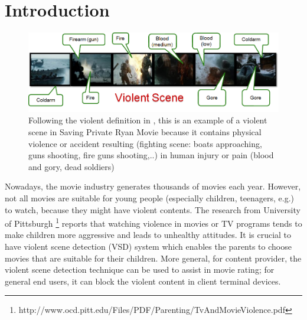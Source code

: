 \documentclass[review]{elsarticle}
\begin{document}
\linenumbers

\section{Introduction}

\begin{figure}[!b]
	\centering
	\includegraphics[width=1\linewidth]{Images/ViolentScene.png}
	\caption{Following the violent definition in \cite{demarty2014benchmarking}, this is an example of a violent scene in Saving Private Ryan Movie because it contains physical violence or accident resulting (fighting scene: boats approaching, guns shooting, fire guns shooting,..) in human injury or pain (blood and gory, dead soldiers)}
	\label{fig:exampleVS}
\end{figure}

Nowadays, the movie industry generates thousands of movies each year. However, not all movies are suitable for young people (especially children, teenagers, e.g.) to watch, because they might have violent contents.   The research from University of Pittsburgh \footnote{http://www.ocd.pitt.edu/Files/PDF/Parenting/TvAndMovieViolence.pdf} reports that watching violence in movies or TV programs tends to make children more aggressive and leads to unhealthy attitudes. It is crucial to have violent scene detection (VSD) system which enables the parents to choose movies that are suitable for their children. More general, for content provider, the violent scene detection technique can be used to assist in movie rating; for general end users, it can block the violent content in client terminal devices. 

\end{document}
